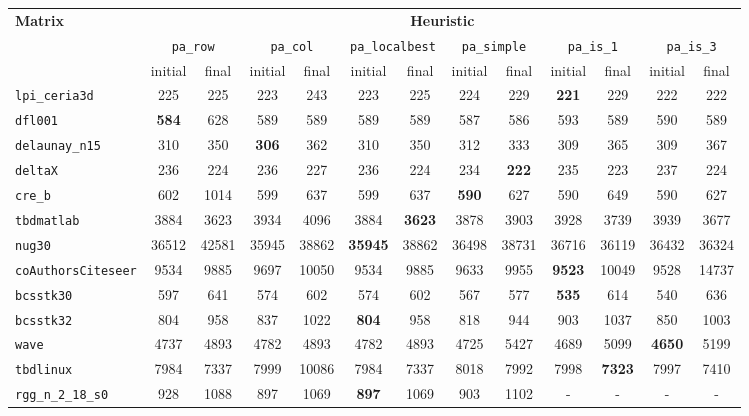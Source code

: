 \begin{table}
	\begin{tabular}{|l|c|c||c|c||c|c||c|c||c|c||c|c|}
	\hline
	\multirow{3}{*}{\textbf{Matrix}} & \multicolumn{12}{c|}{\textbf{Heuristic}} \\ \cline{2-13}
	& \multicolumn{2}{c||}{\texttt{pa\_row}} &  \multicolumn{2}{c||}{\texttt{pa\_col}} & \multicolumn{2}{c||}{\texttt{pa\_localbest}} & \multicolumn{2}{c||}{\texttt{pa\_simple}} & \multicolumn{2}{c||}{\texttt{pa\_is\_1}} & \multicolumn{2}{c|}{\texttt{pa\_is\_3}} \\\cline{2-13}
	& initial & final & initial & final & initial & final & initial & final & initial & final & initial & final \\ \hline
	\verb|lpi_ceria3d| & 225 & 225 & 223 & 243 & 223 & 225 &  224 & 229 & \textbf{221} & 229 & 222 & 222 \\
	\verb|dfl001| & \textbf{584} & 628 & 589 & 589 & 589 & 589 & 587 & 586 & 593 & 589 & 590 & 589 \\
	\verb|delaunay_n15| & 310 & 350 & \textbf{306} & 362 & 310 & 350 & 312 & 333 & 309 & 365 & 309 & 367\\
	\verb|deltaX| & 236 & 224 & 236 & 227 & 236 & 224 & 234 & \textbf{222} & 235 & 223 & 237 & 224 \\
	\verb|cre_b| & 602 & 1014 & 599 & 637 & 599 & 637 & \textbf{590} & 627 & 590 & 649 & 590 & 627 \\
	\verb|tbdmatlab|& 3884 & 3623 & 3934 & 4096 & 3884 & \textbf{3623} & 3878 & 3903 & 3928 & 3739 & 3939 & 3677 \\
	\verb|nug30| & 36512 & 42581 & 35945 & 38862 & \textbf{35945} & 38862 & 36498 & 38731 & 36716 & 36119 & 36432 & 36324 \\
	\verb|coAuthorsCiteseer| & 9534 & 9885 & 9697 & 10050 & 9534 & 9885 & 9633 & 9955 & \textbf{9523} & 10049 & 9528 & 14737 \\
	\verb|bcsstk30| & 597 & 641 & 574 & 602 & 574 & 602 & 567 & 577 & \textbf{535} & 614 & 540 & 636 \\
	\verb|bcsstk32| & 804 & 958 & 837 & 1022 & \textbf{804} & 958 & 818 & 944 & 903 & 1037 & 850 & 1003 \\
	\verb|wave| & 4737 & 4893 & 4782 & 4893 & 4782 & 4893 & 4725 & 5427 & 4689 & 5099 & \textbf{4650} & 5199 \\
	\verb|tbdlinux| &  7984 & 7337 & 7999 & 10086 & 7984 & 7337 & 8018 & 7992 & 7998 & \textbf{7323} & 7997 & 7410 \\
	\verb|rgg_n_2_18_s0| & 928 & 1088 & 897 & 1069 & \textbf{897} & 1069 & 903 & 1102 & - & - & - & - \\

\end{tabular}
\end{table}
